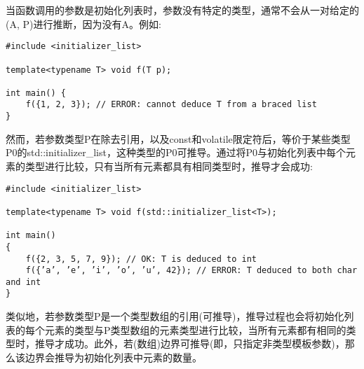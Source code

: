 当函数调用的参数是初始化列表时，参数没有特定的类型，通常不会从一对给定的(A, P)进行推断，因为没有A。例如:

\begin{lstlisting}[style=styleCXX]
#include <initializer_list>

template<typename T> void f(T p);

int main() {
	f({1, 2, 3}); // ERROR: cannot deduce T from a braced list
}
\end{lstlisting}

然而，若参数类型P在除去引用，以及const和volatile限定符后，等价于某些类型P0的std::initializer\_list，这种类型的P0可推导。通过将P0与初始化列表中每个元素的类型进行比较，只有当所有元素都具有相同类型时，推导才会成功:

\begin{lstlisting}[style=styleCXX]
#include <initializer_list>

template<typename T> void f(std::initializer_list<T>);

int main()
{
	f({2, 3, 5, 7, 9}); // OK: T is deduced to int
	f({’a’, ’e’, ’i’, ’o’, ’u’, 42}); // ERROR: T deduced to both char and int
}
\end{lstlisting}

类似地，若参数类型P是一个类型数组的引用(可推导)，推导过程也会将初始化列表的每个元素的类型与P类型数组的元素类型进行比较，当所有元素都有相同的类型时，推导才成功。此外，若(数组)边界可推导(即，只指定非类型模板参数)，那么该边界会推导为初始化列表中元素的数量。












































